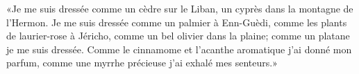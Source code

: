 «Je me suis dressée comme un cèdre sur le Liban,
	un cyprès dans la montagne de l’Hermon.
Je me suis dressée comme un palmier à Enn-Guèdi,
	comme les plants de laurier-rose à Jéricho,
	comme un bel olivier dans la plaine;
	comme un platane je me suis dressée.
Comme le cinnamome et l’acanthe aromatique j’ai donné mon parfum,
	comme une myrrhe précieuse j’ai exhalé mes senteurs.»
